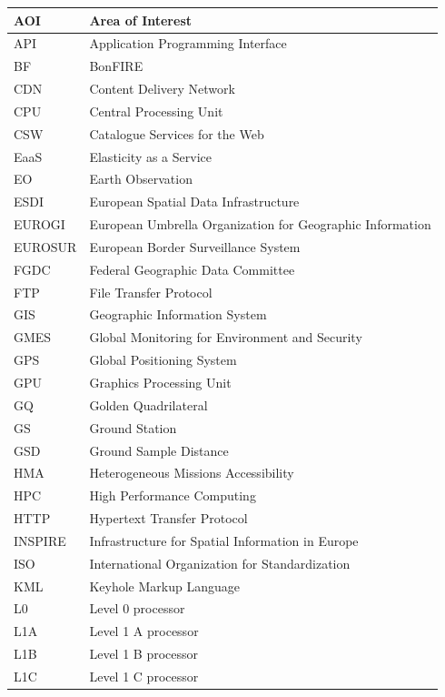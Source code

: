 \documentclass[a4paper]{article}
\begin{document}
\begin{flushleft}
\tablehead{}
\begin{supertabular}{|m{0.8823598in}|m{5.35596in}|}
\hline
AOI &
Area of Interest\\\hline
API &
Application Programming Interface\\\hline
BF &
BonFIRE\\\hline
CDN &
Content Delivery Network\\\hline
CPU &
Central Processing Unit\\\hline
CSW &
Catalogue Services for the Web\\\hline
EaaS &
Elasticity as a Service\\\hline
EO &
Earth Observation\\\hline
ESDI &
European Spatial Data Infrastructure\\\hline
EUROGI &
European Umbrella Organization for Geographic Information\\\hline
EUROSUR &
European Border Surveillance System\\\hline
FGDC &
Federal Geographic Data Committee\\\hline
FTP &
File Transfer Protocol\\\hline
GIS &
Geographic Information System\\\hline
GMES &
Global Monitoring for Environment and Security\\\hline
GPS &
Global Positioning System\\\hline
GPU &
Graphics Processing Unit\\\hline
GQ &
Golden Quadrilateral\\\hline
GS &
Ground Station\\\hline
GSD &
Ground Sample Distance\\\hline
HMA &
Heterogeneous Missions Accessibility\\\hline
HPC &
High Performance Computing\\\hline
HTTP &
Hypertext Transfer Protocol\\\hline
INSPIRE &
Infrastructure for Spatial Information in Europe\\\hline
ISO &
International Organization for Standardization\\\hline
KML &
Keyhole Markup Language\\\hline
L0 &
Level 0 processor\\\hline
L1A\  &
Level 1 A processor\\\hline
L1B &
Level 1 B processor\\\hline
L1C &
Level 1 C processor\\\hline

\end{supertabular}
\end{flushleft}
\end{document}
